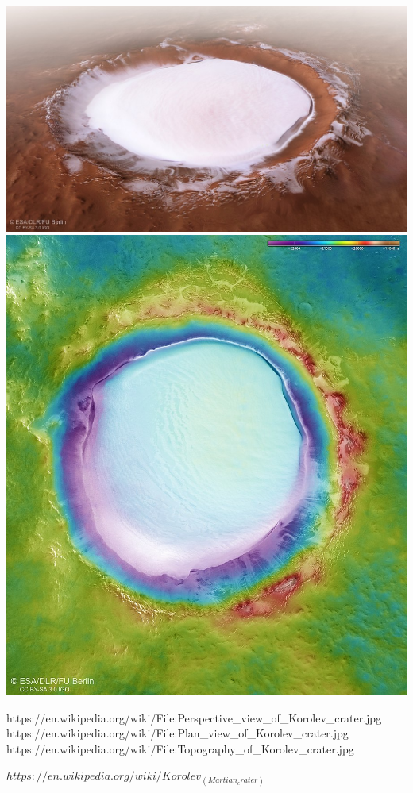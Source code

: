 \documentclass[10pt]{article}
\begin{document}
\includegraphics[width=1\textwidth]{1024px-Perspective_view_of_Korolev_crater1024x576.jpg}
\includegraphics[width=1\textwidth]{890px-Topography_of_Korolev_crater.jpg}


https://en.wikipedia.org/wiki/File:Perspective_view_of_Korolev_crater.jpg
https://en.wikipedia.org/wiki/File:Plan_view_of_Korolev_crater.jpg
https://en.wikipedia.org/wiki/File:Topography_of_Korolev_crater.jpg

$https://en.wikipedia.org/wiki/Korolev_(Martian_crater)$
\end{document}
